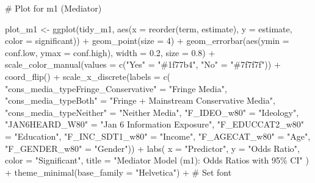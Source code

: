 \documentclass[
  letterpaper,
  DIV=11,
  numbers=noendperiod]{scrartcl}
\newenvironment{Shaded}{\begin{snugshade}}{\end{snugshade}}
\newcommand{\AttributeTok}[1]{\textcolor[rgb]{0.40,0.45,0.13}{#1}}
\newcommand{\CommentTok}[1]{\textcolor[rgb]{0.37,0.37,0.37}{#1}}
\newcommand{\DecValTok}[1]{\textcolor[rgb]{0.68,0.00,0.00}{#1}}
\newcommand{\FloatTok}[1]{\textcolor[rgb]{0.68,0.00,0.00}{#1}}
\newcommand{\FunctionTok}[1]{\textcolor[rgb]{0.28,0.35,0.67}{#1}}
\newcommand{\NormalTok}[1]{\textcolor[rgb]{0.00,0.23,0.31}{#1}}
\newcommand{\OtherTok}[1]{\textcolor[rgb]{0.00,0.23,0.31}{#1}}
\newcommand{\SpecialCharTok}[1]{\textcolor[rgb]{0.37,0.37,0.37}{#1}}
\newcommand{\StringTok}[1]{\textcolor[rgb]{0.13,0.47,0.30}{#1}}
\begin{document}
\begin{Shaded}
\begin{Highlighting}[]
\CommentTok{\# Plot for m1 (Mediator)}

\NormalTok{plot\_m1 }\OtherTok{\textless{}{-}} \FunctionTok{ggplot}\NormalTok{(tidy\_m1, }\FunctionTok{aes}\NormalTok{(}\AttributeTok{x =} \FunctionTok{reorder}\NormalTok{(term, estimate), }\AttributeTok{y =}\NormalTok{ estimate, }\AttributeTok{color =}\NormalTok{ significant)) }\SpecialCharTok{+}
  \FunctionTok{geom\_point}\NormalTok{(}\AttributeTok{size =} \DecValTok{4}\NormalTok{) }\SpecialCharTok{+}
  \FunctionTok{geom\_errorbar}\NormalTok{(}\FunctionTok{aes}\NormalTok{(}\AttributeTok{ymin =}\NormalTok{ conf.low, }\AttributeTok{ymax =}\NormalTok{ conf.high), }\AttributeTok{width =} \FloatTok{0.2}\NormalTok{, }\AttributeTok{size =} \FloatTok{0.8}\NormalTok{) }\SpecialCharTok{+}
  \FunctionTok{scale\_color\_manual}\NormalTok{(}\AttributeTok{values =} \FunctionTok{c}\NormalTok{(}\StringTok{"Yes"} \OtherTok{=} \StringTok{"\#1f77b4"}\NormalTok{, }\StringTok{"No"} \OtherTok{=} \StringTok{"\#7f7f7f"}\NormalTok{)) }\SpecialCharTok{+}
  \FunctionTok{coord\_flip}\NormalTok{() }\SpecialCharTok{+}
  \FunctionTok{scale\_x\_discrete}\NormalTok{(}\AttributeTok{labels =} \FunctionTok{c}\NormalTok{(}
    \StringTok{"cons\_media\_typeFringe\_Conservative"} \OtherTok{=} \StringTok{"Fringe Media"}\NormalTok{,}
    \StringTok{"cons\_media\_typeBoth"} \OtherTok{=} \StringTok{"Fringe + Mainstream Conservative Media"}\NormalTok{,}
    \StringTok{"cons\_media\_typeNeither"} \OtherTok{=} \StringTok{"Neither Media"}\NormalTok{,}
    \StringTok{"F\_IDEO\_w80"} \OtherTok{=} \StringTok{"Ideology"}\NormalTok{,}
    \StringTok{"JAN6HEARD\_W80"} \OtherTok{=} \StringTok{"Jan 6 Information Exposure"}\NormalTok{,}
    \StringTok{"F\_EDUCCAT2\_w80"} \OtherTok{=} \StringTok{"Education"}\NormalTok{,}
    \StringTok{"F\_INC\_SDT1\_w80"} \OtherTok{=} \StringTok{"Income"}\NormalTok{,}
    \StringTok{"F\_AGECAT\_w80"} \OtherTok{=} \StringTok{"Age"}\NormalTok{,}
    \StringTok{"F\_GENDER\_w80"} \OtherTok{=} \StringTok{"Gender"}\NormalTok{)) }\SpecialCharTok{+}
  \FunctionTok{labs}\NormalTok{(}
    \AttributeTok{x =} \StringTok{"Predictor"}\NormalTok{,}
    \AttributeTok{y =} \StringTok{"Odds Ratio"}\NormalTok{,}
    \AttributeTok{color =} \StringTok{"Significant"}\NormalTok{,}
    \AttributeTok{title =} \StringTok{"Mediator Model (m1): Odds Ratios with 95\% CI"}
\NormalTok{  ) }\SpecialCharTok{+}
  \FunctionTok{theme\_minimal}\NormalTok{(}\AttributeTok{base\_family =} \StringTok{"Helvetica"}\NormalTok{) }\SpecialCharTok{+}  \CommentTok{\# Set font}

\end{Highlighting}
\end{Shaded}
\end{document}
